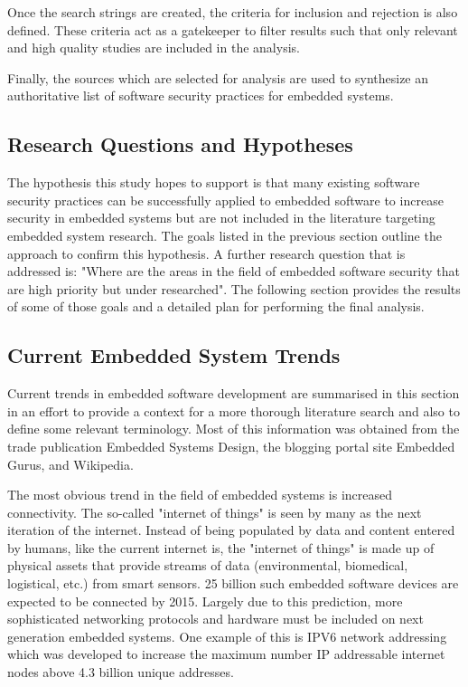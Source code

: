 \documentclass[final,conference,10pt]{IEEEtran}
\begin{document}
Once the search strings are created, the criteria for inclusion and rejection is also defined.  These criteria act as a gatekeeper to filter results such that only relevant and high quality studies are included in the analysis.

Finally, the sources which are selected for analysis are used to synthesize an authoritative list of software security practices for embedded systems.  

\subsection{Research Questions and Hypotheses}

The hypothesis this study hopes to support is that many existing software security practices can be successfully applied to embedded software to increase security in embedded systems but are not included in the literature targeting embedded system research.  The goals listed in the previous section outline the approach to confirm this hypothesis.  A further research question that is addressed is: "Where are the areas in the field of embedded software security that are high priority but under researched". The following section provides the results of some of those goals and a detailed plan for performing the final analysis.

\subsection{Current Embedded System Trends}

Current trends in embedded software development are summarised in this section in an effort to provide a context for a more thorough literature search and also to define some relevant terminology.  Most of this information was obtained from the trade publication Embedded Systems Design, the blogging portal site Embedded Gurus, and Wikipedia.  

The most obvious trend in the field of embedded systems is increased connectivity.  The so-called "internet of things" is seen by many as the next iteration of the internet. Instead of being populated by data and content entered by humans, like the current internet is, the "internet of things" is made up of physical assets that provide streams of data (environmental, biomedical, logistical, etc.) from smart sensors.  25 billion such embedded software devices are expected to be connected by 2015. Largely due to this prediction, more sophisticated networking protocols and hardware must be included on next generation embedded systems.  One example of this is IPV6 network addressing which was developed to increase the maximum number IP addressable internet nodes above 4.3 billion unique addresses.  
\end{document}
